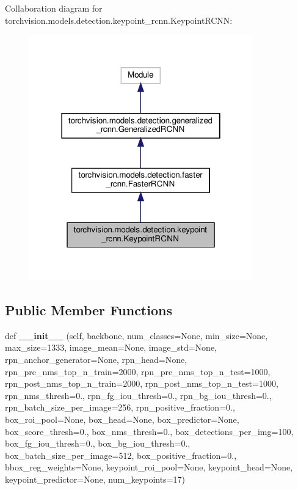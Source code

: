 Collaboration diagram for torchvision.\+models.\+detection.\+keypoint\+\_\+rcnn.\+Keypoint\+R\+C\+NN\+:
\nopagebreak
\begin{figure}[H]
\begin{center}
\leavevmode
\includegraphics[width=274pt]{classtorchvision_1_1models_1_1detection_1_1keypoint__rcnn_1_1KeypointRCNN__coll__graph}
\end{center}
\end{figure}
\subsection*{Public Member Functions}
\begin{DoxyCompactItemize}
\item 
\mbox{\label{classtorchvision_1_1models_1_1detection_1_1keypoint__rcnn_1_1KeypointRCNN_aeb10b96e88e7702fd1378b9719316569}} 
def {\bfseries \+\_\+\+\_\+init\+\_\+\+\_\+} (self, backbone, num\+\_\+classes=None, min\+\_\+size=None, max\+\_\+size=1333, image\+\_\+mean=None, image\+\_\+std=None, rpn\+\_\+anchor\+\_\+generator=None, rpn\+\_\+head=None, rpn\+\_\+pre\+\_\+nms\+\_\+top\+\_\+n\+\_\+train=2000, rpn\+\_\+pre\+\_\+nms\+\_\+top\+\_\+n\+\_\+test=1000, rpn\+\_\+post\+\_\+nms\+\_\+top\+\_\+n\+\_\+train=2000, rpn\+\_\+post\+\_\+nms\+\_\+top\+\_\+n\+\_\+test=1000, rpn\+\_\+nms\+\_\+thresh=0., rpn\+\_\+fg\+\_\+iou\+\_\+thresh=0., rpn\+\_\+bg\+\_\+iou\+\_\+thresh=0., rpn\+\_\+batch\+\_\+size\+\_\+per\+\_\+image=256, rpn\+\_\+positive\+\_\+fraction=0., box\+\_\+roi\+\_\+pool=None, box\+\_\+head=None, box\+\_\+predictor=None, box\+\_\+score\+\_\+thresh=0., box\+\_\+nms\+\_\+thresh=0., box\+\_\+detections\+\_\+per\+\_\+img=100, box\+\_\+fg\+\_\+iou\+\_\+thresh=0., box\+\_\+bg\+\_\+iou\+\_\+thresh=0., box\+\_\+batch\+\_\+size\+\_\+per\+\_\+image=512, box\+\_\+positive\+\_\+fraction=0., bbox\+\_\+reg\+\_\+weights=None, keypoint\+\_\+roi\+\_\+pool=None, keypoint\+\_\+head=None, keypoint\+\_\+predictor=None, num\+\_\+keypoints=17)
\end{DoxyCompactItemize}
